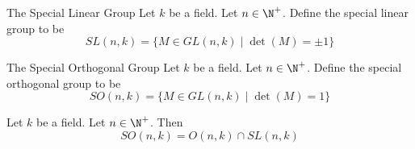 \documentclass[a4paper]{article}
\begin{document}
\begin{defn}{The Special Linear Group}{} Let $k$ be a field. Let $n\in\N^+$. Define the special linear group to be $$SL(n,k)=\{M\in GL(n,k)\;|\;\det(M)=\pm1\}$$
\end{defn}

\begin{defn}{The Special Orthogonal Group}{} Let $k$ be a field. Let $n\in\N^+$. Define the special orthogonal group to be $$SO(n,k)=\{M\in GL(n,k)\;|\;\det(M)=1\}$$
\end{defn}

\begin{lmm}{}{} Let $k$ be a field. Let $n\in\N^+$. Then $$SO(n,k)=O(n,k)\cap SL(n,k)$$
\end{lmm}
\end{document}
